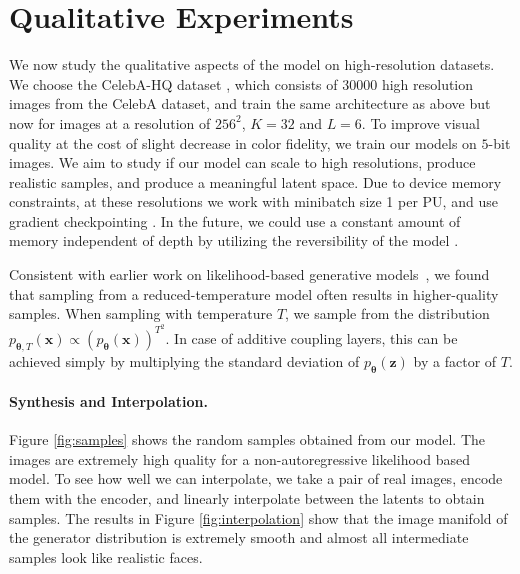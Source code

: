 \documentclass{article}
\newcommand{\bb}[1]{\mathbf{#1}}
\newcommand{\bx}{\bb{x}}
\newcommand{\bz}{\bb{z}}
\newcommand{\bT}{\boldsymbol{\theta}}
\newcommand{\pT}{p_{\bT}}
\begin{document}
\section{Qualitative Experiments}\label{sec:qualexperiments}
We now study the qualitative aspects of the model on high-resolution datasets. We choose the CelebA-HQ dataset \citep{karras2017progressive}, which consists of $30000$ high resolution images from the CelebA dataset, and train the same architecture as above but now for images at a resolution of $256^2$, $K=32$ and $L=6$. To improve visual quality at the cost of slight decrease in color fidelity, we train our models on $5$-bit images. We aim to study if our model can scale to high resolutions, produce realistic samples, and produce a meaningful latent space. Due to device memory constraints, at these resolutions we work with minibatch size 1 per PU, and use gradient checkpointing \citep{gradcheckpointing}. In the future, we could use a constant amount of memory independent of depth by utilizing the reversibility of the model \citep{gomez2017reversible}.

Consistent with earlier work on likelihood-based generative models~\citep{parmar2018image}, we found that sampling from a reduced-temperature model often results in higher-quality samples. When sampling with temperature $T$, we sample from the distribution $p_{\boldsymbol{\theta},T}(\bx) \propto (\pT(\bx))^{T^2}$. In case of additive coupling layers, this can be achieved simply by multiplying the standard deviation of $\pT(\bz)$ by a factor of $T$.

\paragraph{Synthesis and Interpolation.}
Figure \ref{fig:samples} shows the random samples obtained from our model. The images are extremely high quality for a non-autoregressive likelihood based model. To see how well we can interpolate, we take a pair of real images, encode them with the encoder, and linearly interpolate between the latents to obtain samples. The results in Figure \ref{fig:interpolation} show that the image manifold of the generator distribution is extremely smooth and almost all intermediate samples look like realistic faces.
\end{document}
